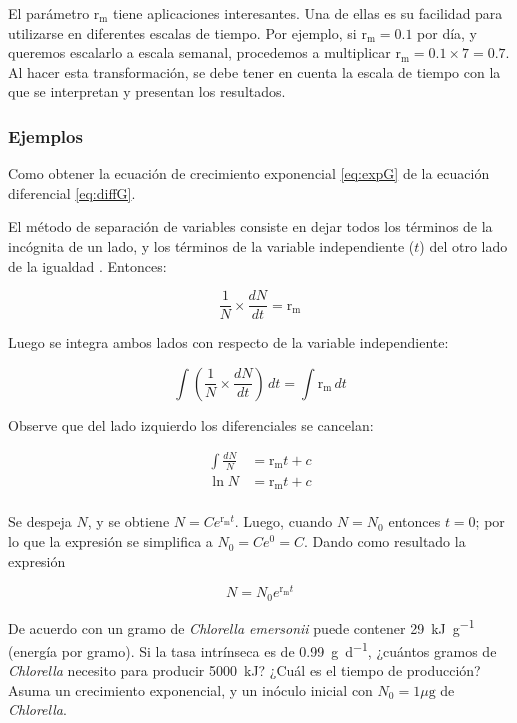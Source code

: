 \documentclass[12pt,letterpaper,]{book}
\let\BeginKnitrBlock\begin \let\EndKnitrBlock\end
\begin{document}
El parámetro \(\mathrm{r_m}\) tiene aplicaciones interesantes. Una de
ellas es su facilidad para utilizarse en diferentes escalas de tiempo.
Por ejemplo, si \(\mathrm{r_m} = 0.1\) por día, y queremos escalarlo a
escala semanal, procedemos a multiplicar
\(\mathrm{r_m} = 0.1 \times 7 = 0.7\). Al hacer esta transformación, se
debe tener en cuenta la escala de tiempo con la que se interpretan y
presentan los resultados.

\subsubsection{Ejemplos}\label{ejemplos-1}

\BeginKnitrBlock{example}
\protect\hypertarget{exm:exp1}{}{\label{exm:exp1} } Como obtener la ecuación
de crecimiento exponencial \eqref{eq:expG} de la ecuación diferencial
\eqref{eq:diffG}.
\EndKnitrBlock{example}

El método de separación de variables consiste en dejar todos los
términos de la incógnita de un lado, y los términos de la variable
independiente (\(t\)) del otro lado de la igualdad
\citep{Barrantes2015}. Entonces:

\[
\frac{1}{N} \times \frac{dN}{dt}=\mathrm{r_m}
\]

Luego se integra ambos lados con respecto de la variable independiente:

\[
\int \left( \frac{1}{N} \times \frac{dN}{dt}\right)\,dt=\int \mathrm{r_m}\,dt
\]

Observe que del lado izquierdo los diferenciales se cancelan:

\begin{equation*}
\begin{split}
\int \frac{dN}{N}&=\mathrm{r_m} t + c\\
\ln N & = \mathrm{r_m} t + c\\
\end{split}
\end{equation*}

Se despeja \(N\), y se obtiene \(N=Ce^{\mathrm{r_m} t}\). Luego, cuando
\(N=N_0\) entonces \(t=0\); por lo que la expresión se simplifica a
\(N_0 = C e^0 = C\). Dando como resultado la expresión

\[
N = N_0 e^{\mathrm{r_m} t}
\]

\BeginKnitrBlock{example}
\protect\hypertarget{exm:exp2}{}{\label{exm:exp2} }De acuerdo con
\citet{ILLMAN2000631} un gramo de \emph{Chlorella emersonii} puede
contener \SI{29}{\kilo\joule\per\gram} (energía por gramo). Si la tasa
intrínseca es de \SI{0.99}{\gram\per\day}, ¿cuántos gramos de
\emph{Chlorella} necesito para producir \SI{5000}{\kilo\joule}? ¿Cuál es
el tiempo de producción? Asuma un crecimiento exponencial, y un inóculo
inicial con \(N_0 = 1\mu \si{\gram}\) de \emph{Chlorella}.
\EndKnitrBlock{example}
\end{document}

